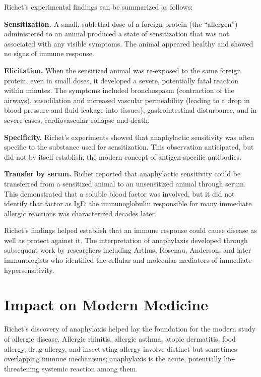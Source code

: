 Richet's experimental findings can be summarized as follows:

\textbf{Sensitization.} A small, sublethal dose of a foreign protein (the ``allergen'') administered to an animal produced a state of sensitization that was not associated with any visible symptoms. The animal appeared healthy and showed no signs of immune response.

\textbf{Elicitation.} When the sensitized animal was re-exposed to the same foreign protein, even in small doses, it developed a severe, potentially fatal reaction within minutes. The symptoms included bronchospasm (contraction of the airways), vasodilation and increased vascular permeability (leading to a drop in blood pressure and fluid leakage into tissues), gastrointestinal disturbance, and in severe cases, cardiovascular collapse and death.

\textbf{Specificity.} Richet's experiments showed that anaphylactic sensitivity was often specific to the substance used for sensitization. This observation anticipated, but did not by itself establish, the modern concept of antigen-specific antibodies.

\textbf{Transfer by serum.} Richet reported that anaphylactic sensitivity could be transferred from a sensitized animal to an unsensitized animal through serum. This demonstrated that a soluble blood factor was involved, but it did not identify that factor as IgE; the immunoglobulin responsible for many immediate allergic reactions was characterized decades later.\cite{richet-immunology}

Richet's findings helped establish that an immune response could cause disease as well as protect against it. The interpretation of anaphylaxis developed through subsequent work by researchers including Arthus, Rosenau, Anderson, and later immunologists who identified the cellular and molecular mediators of immediate hypersensitivity.\cite{richet-lecture,richet-immunology}

\section{Impact on Modern Medicine}

Richet's discovery of anaphylaxis helped lay the foundation for the modern study of allergic disease. Allergic rhinitis, allergic asthma, atopic dermatitis, food allergy, drug allergy, and insect-sting allergy involve distinct but sometimes overlapping immune mechanisms; anaphylaxis is the acute, potentially life-threatening systemic reaction among them.

